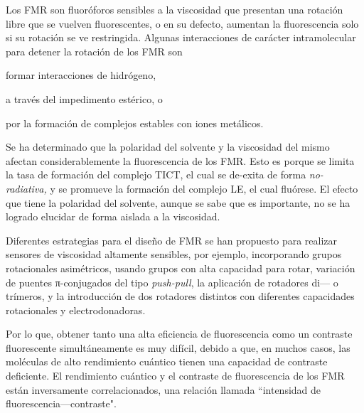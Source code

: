 Los \gls{FMR} son fluoróforos sensibles a la viscosidad que presentan una rotación libre que se vuelven fluorescentes, o en su defecto, aumentan la fluorescencia solo si su rotación se ve restringida. Algunas interacciones de carácter intramolecular para detener la rotación de los \gls{FMR} son \begin{inparaenum}[i.]
	\item formar interacciones de hidrógeno,\autocite{wuMultistageRotationalSpeed2018}
	\item a través del impedimento estérico,\autocite{faulknerAllostericRegulationRotational2016} o
	\item por la formación de complejos estables con iones metálicos.\autocite{yadavViscochromicMechanochromicUnsymmetrical2019}
\end{inparaenum}

Se ha determinado que la polaridad del solvente y la viscosidad del mismo afectan considerablemente la fluorescencia de los \gls{FMR}. Esto es porque se limita la tasa de formación del complejo \gls{TICT}, el cual se de-exita de forma \emph{no-radiativa,} y se promueve la formación del complejo \gls{LE}, el cual fluórese. El efecto que tiene la polaridad del solvente, aunque se sabe que es importante, no se ha logrado elucidar de forma aislada a la viscosidad.\cite{haidekkerEffectsSolventPolarity2005}

Diferentes estrategias para el diseño de \gls{FMR} se han propuesto para realizar sensores de viscosidad altamente sensibles, por ejemplo, incorporando grupos rotacionales asimétricos,\autocite{leePyrrolicMolecularRotors2016} usando grupos con alta capacidad para rotar,\autocite{karpenkoPushPullDioxaborine2016} variación de puentes π-conjugados del tipo \emph{push-pull},\autocite{karpenkoPushPullDioxaborine2016} la aplicación de rotadores di— o trímeros,\autocite{kimballBODIPYBODIPYDyad2015} y la introducción de dos rotadores distintos con diferentes capacidades rotacionales y electrodonadoras. \autocite{rautTriazinebasedBODIPYTrimer2016}

Por lo que, obtener tanto una alta eficiencia de fluorescencia como un contraste fluorescente simultáneamente es muy difícil, debido a que, en muchos casos, las moléculas de alto rendimiento cuántico tienen una capacidad de contraste deficiente.
El rendimiento cuántico y el contraste de fluorescencia de los \gls{FMR} están inversamente correlacionados, una relación llamada ``intensidad de fluorescencia---contraste".\autocite{leeFrontCoverFluorescent2018}

